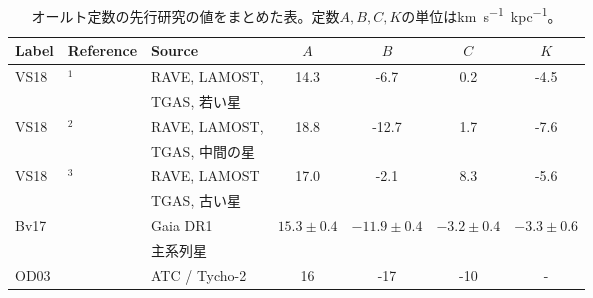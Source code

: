 \begin{table}
\begin{center}
\scriptsize
\begin{tabular}{l|l|l|c|c|c|c} \hline
 \rowcolor{LightCyan}
 Label & Reference & Source & $A$ & $B$ & $C$ & $K$\\
  \hline
 \multirow{2}{*}{VS18} & \multirow{2}{*}{\cite{VM2018}$^1$} & RAVE, LAMOST, & \multirow{2}{*}{14.3} & \multirow{2}{*}{-6.7} & \multirow{2}{*}{0.2} & \multirow{2}{*}{-4.5} 
    \\ && TGAS, 若い星 &&&& \tabularnewline[\doublerulesep] 
 \hline
 \multirow{2}{*}{VS18} & \multirow{2}{*}{\cite{VM2018}$^2$} & RAVE, LAMOST, & \multirow{2}{*}{18.8} & \multirow{2}{*}{-12.7} & \multirow{2}{*}{1.7} & \multirow{2}{*}{-7.6} 
    \\ && TGAS, 中間の星 &&&& \tabularnewline[\doublerulesep] 
 \hline
 \multirow{2}{*}{VS18} & \multirow{2}{*}{\cite{VM2018}$^3$} & RAVE, LAMOST & \multirow{2}{*}{17.0} & \multirow{2}{*}{-2.1} & \multirow{2}{*}{8.3} & \multirow{2}{*}{-5.6}
    \\ && TGAS, 古い星 &&&& \tabularnewline[\doublerulesep]
 \hline
 \multirow{2}{*}{Bv17} & \multirow{2}{*}{\cite{Bovy17}} & Gaia DR1 & \multirow{2}{*}{$15.3\pm0.4$} & \multirow{2}{*}{$-11.9\pm0.4$} & \multirow{2}{*}{$-3.2\pm0.4$} & \multirow{2}{*}{$-3.3\pm0.6$}
    \\ && 主系列星 &&&& \tabularnewline[\doublerulesep]
 \hline
 OD03 & \cite{OD03} & ATC / Tycho-2 & 16 & -17 & -10 & -\\
  \hline
\end{tabular}
\caption{オールト定数の先行研究の値をまとめた表。定数$A,B,C,K$の単位は\si{km.s^{-1}.kpc^{-1}}。}
\label{table2}
\end{center}
\end{table}

